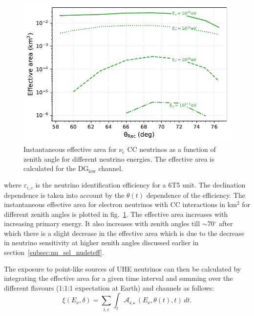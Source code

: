 \begin{figure}[t!]
  \centering
  \includegraphics[width=14.5cm]{thesis_figures/PointLimits/EffArea_vs_Theta_CC_optim.pdf}
  \caption{Instantaneous effective area for $\nu_e$ CC neutrinos as a function of zenith angle for different neutrino energies. The effective area is calculated for the DG$\mathrm{_{\text{low}}}$ channel.}
  \label{fig:Eff_Area}
\end{figure}


where $\varepsilon_{i,c}$ is the neutrino identification efficiency for a 6T5 unit. The declination dependence is taken into account by the $\theta(t)$ dependence of the efficiency. The instantaneous effective area for electron neutrinos with CC interactions in km$^2$ for different zenith angles is plotted in fig.~\ref{fig:Eff_Area}. The effective area increases with increasing primary energy. It also increases with zenith angles till $\sim$70$^\circ$ after which there is a slight decrease in the effective area which is due to the decrease in neutrino sensitivity at higher zenith angles discussed earlier in section~\ref{subsec:nu_sel_nudeteff}. 

The exposure to point-like sources of UHE neutrinos can then be calculated by integrating the effective area for a given time interval and summing over the different flavours (1:1:1 expectation at Earth) and channels as follows:
\begin{equation}
  \label{eq:exposure_point}
  \xi(E_{\nu}, \delta) = \sum_{i,c} \int_{t} \mathcal{A_{i,c}} \, (E_{\nu},\theta(t),t) \, dt.
\end{equation}


